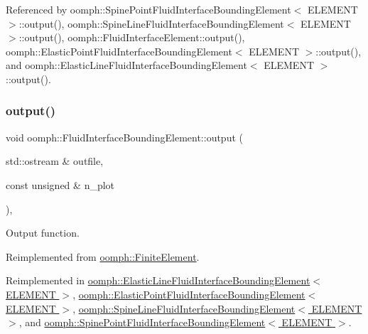 Referenced by oomph\+::\+Spine\+Point\+Fluid\+Interface\+Bounding\+Element$<$ E\+L\+E\+M\+E\+N\+T $>$\+::output(), oomph\+::\+Spine\+Line\+Fluid\+Interface\+Bounding\+Element$<$ E\+L\+E\+M\+E\+N\+T $>$\+::output(), oomph\+::\+Fluid\+Interface\+Element\+::output(), oomph\+::\+Elastic\+Point\+Fluid\+Interface\+Bounding\+Element$<$ E\+L\+E\+M\+E\+N\+T $>$\+::output(), and oomph\+::\+Elastic\+Line\+Fluid\+Interface\+Bounding\+Element$<$ E\+L\+E\+M\+E\+N\+T $>$\+::output().

\mbox{\label{classoomph_1_1FluidInterfaceBoundingElement_af2c821d51d506221976a0c17e1615ac3}} 
\subsubsection{\texorpdfstring{output()}{output()}\hspace{0.1cm}{\footnotesize\ttfamily [2/4]}}
{\footnotesize\ttfamily void oomph\+::\+Fluid\+Interface\+Bounding\+Element\+::output (\begin{DoxyParamCaption}\item[{std\+::ostream \&}]{outfile,  }\item[{const unsigned \&}]{n\+\_\+plot }\end{DoxyParamCaption})\hspace{0.3cm}{\ttfamily [inline]}, {\ttfamily [virtual]}}



Output function. 



Reimplemented from \hyperlink{classoomph_1_1FiniteElement_afa9d9b2670f999b43e6679c9dd28c457}{oomph\+::\+Finite\+Element}.



Reimplemented in \hyperlink{classoomph_1_1ElasticLineFluidInterfaceBoundingElement_a7a0df1419f28df0351ed1c5e05f8f751}{oomph\+::\+Elastic\+Line\+Fluid\+Interface\+Bounding\+Element$<$ E\+L\+E\+M\+E\+N\+T $>$}, \hyperlink{classoomph_1_1ElasticPointFluidInterfaceBoundingElement_a20c0678a9fdd6ef91fe48aa1b9209c38}{oomph\+::\+Elastic\+Point\+Fluid\+Interface\+Bounding\+Element$<$ E\+L\+E\+M\+E\+N\+T $>$}, \hyperlink{classoomph_1_1SpineLineFluidInterfaceBoundingElement_a77acf17ce730f50acd0d850e7460fc4d}{oomph\+::\+Spine\+Line\+Fluid\+Interface\+Bounding\+Element$<$ E\+L\+E\+M\+E\+N\+T $>$}, and \hyperlink{classoomph_1_1SpinePointFluidInterfaceBoundingElement_a05a5383f07c840e07d8c2279cce80aaa}{oomph\+::\+Spine\+Point\+Fluid\+Interface\+Bounding\+Element$<$ E\+L\+E\+M\+E\+N\+T $>$}.



